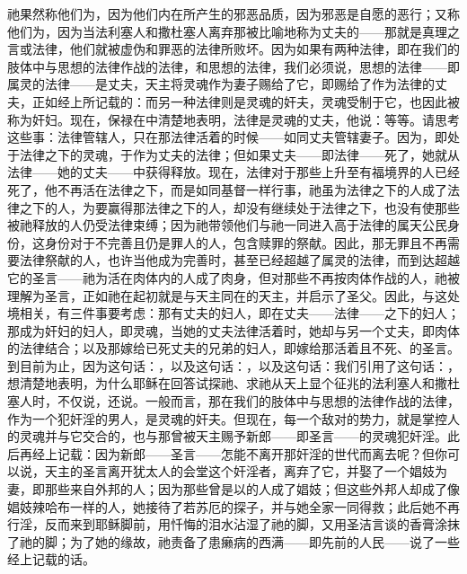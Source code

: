 祂果然称他们为，因为他们内在所产生的邪恶品质，因为邪恶是自愿的恶行；又称他们为，因为当法利塞人和撒杜塞人离弃那被比喻地称为丈夫的——那就是真理之言或法律，他们就被虚伪和罪恶的法律所败坏。因为如果有两种法律，即在我们的肢体中与思想的法律作战的法律，和思想的法律，我们必须说，思想的法律——即属灵的法律——是丈夫，天主将灵魂作为妻子赐给了它，即赐给了作为法律的丈夫，正如经上所记载的：而另一种法律则是灵魂的奸夫，灵魂受制于它，也因此被称为奸妇。现在，保禄在中清楚地表明，法律是灵魂的丈夫，他说：等等。请思考这些事：法律管辖人，只在那法律活着的时候——如同丈夫管辖妻子。因为，即处于法律之下的灵魂，于作为丈夫的法律；但如果丈夫——即法律——死了，她就从法律——她的丈夫——中获得释放。现在，法律对于那些上升至有福境界的人已经死了，他不再活在法律之下，而是如同基督一样行事，祂虽为法律之下的人成了法律之下的人，为要赢得那法律之下的人，却没有继续处于法律之下，也没有使那些被祂释放的人仍受法律束缚；因为祂带领他们与祂一同进入高于法律的属天公民身份，这身份对于不完善且仍是罪人的人，包含赎罪的祭献。因此，那无罪且不再需要法律祭献的人，也许当他成为完善时，甚至已经超越了属灵的法律，而到达超越它的圣言——祂为活在肉体内的人成了肉身，但对那些不再按肉体作战的人，祂被理解为圣言，正如祂在起初就是与天主同在的天主，并启示了圣父。因此，与这处境相关，有三件事要考虑：那有丈夫的妇人，即在丈夫——法律——之下的妇人；那成为奸妇的妇人，即灵魂，当她的丈夫法律活着时，她却与另一个丈夫，即肉体的法律结合；以及那嫁给已死丈夫的兄弟的妇人，即嫁给那活着且不死、的圣言。到目前为止，因为这句话：，以及这句话：，以及这句话：我们引用了这句话：，想清楚地表明，为什么耶稣在回答试探祂、求祂从天上显个征兆的法利塞人和撒杜塞人时，不仅说，还说。一般而言，那在我们的肢体中与思想的法律作战的法律，作为一个犯奸淫的男人，是灵魂的奸夫。但现在，每一个敌对的势力，就是掌控人的灵魂并与它交合的，也与那曾被天主赐予新郎——即圣言——的灵魂犯奸淫。此后再经上记载：因为新郎——圣言——怎能不离开那奸淫的世代而离去呢？但你可以说，天主的圣言离开犹太人的会堂这个奸淫者，离弃了它，并娶了一个娼妓为妻，即那些来自外邦的人；因为那些曾是以的人成了娼妓；但这些外邦人却成了像娼妓辣哈布一样的人，她接待了若苏厄的探子，并与她全家一同得救；此后她不再行淫，反而来到耶稣脚前，用忏悔的泪水沾湿了祂的脚，又用圣洁言谈的香膏涂抹了祂的脚；为了她的缘故，祂责备了患癞病的西满——即先前的人民——说了一些经上记载的话。\par

